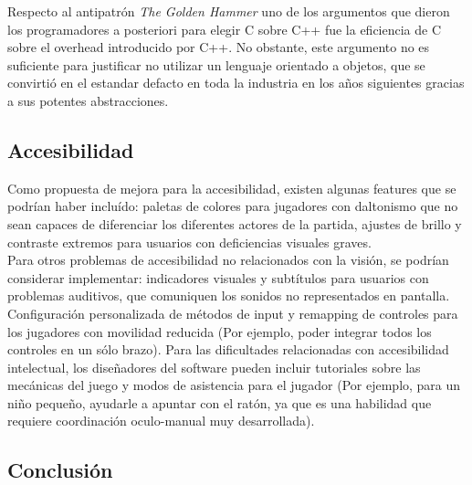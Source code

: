 \documentclass[a4paper,12pt]{report}
\begin{document}
    Respecto al antipatrón \textit{The Golden Hammer} uno de los argumentos que dieron los programadores a posteriori para elegir C sobre C++ fue la eficiencia de C sobre el overhead introducido por C++. No obstante, este argumento no es suficiente para justificar no utilizar un lenguaje orientado a objetos, que se convirtió en el estandar defacto en toda la industria en los años siguientes gracias a sus potentes abstracciones.\\
    
    
    \subsection{Accesibilidad}
    Como propuesta de mejora para la accesibilidad, existen algunas features que se podrían haber incluído: paletas de colores para jugadores con daltonismo que no sean capaces de diferenciar los diferentes actores de la partida,  ajustes de brillo y contraste extremos para usuarios con deficiencias visuales graves. \\
    
    Para otros problemas de accesibilidad no relacionados con la visión, se podrían considerar implementar: indicadores visuales y subtítulos para usuarios con problemas auditivos, que comuniquen los sonidos no representados en pantalla. Configuración personalizada de métodos de input y remapping de controles para los jugadores con movilidad reducida (Por ejemplo, poder integrar todos los controles en un sólo brazo). Para las dificultades relacionadas con accesibilidad intelectual, los diseñadores del software pueden incluir tutoriales sobre las mecánicas del juego y modos de asistencia para el jugador (Por ejemplo, para un niño pequeño, ayudarle a apuntar con el ratón, ya que es una habilidad que requiere coordinación oculo-manual muy desarrollada). %
    
    \subsection{Conclusión}
    
    
	
\end{document}
